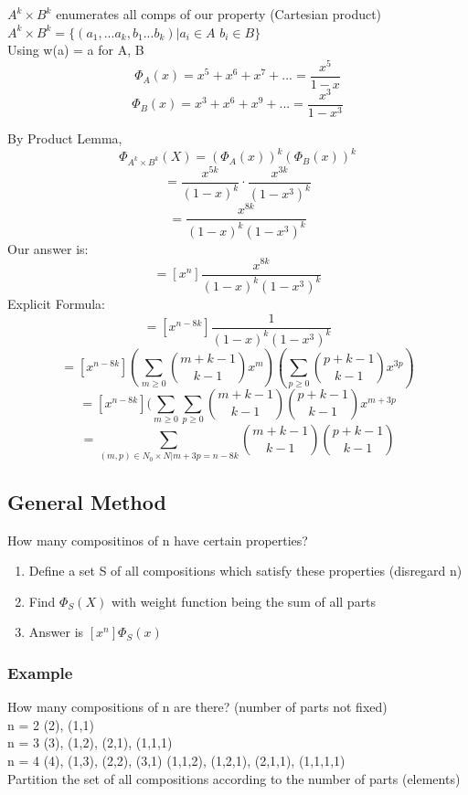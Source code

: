 \documentclass[12pt]{article}
\begin{document}
	$A^k \times B^k$ enumerates all comps of our property (Cartesian product)\\
	$A^k \times B^k = \{(a_1, ...a_k,b_1...b_k) | a_i \in A$ $b_i \in B\}$\\
	
	Using w(a) = a for A, B\\
	$$\Phi_A(x) = x^5 + x^6 + x^7 + ... = \frac{x^5}{1-x}$$
	$$\Phi_B(x) = x^3 + x^6 + x^9 + ... = \frac{x^3}{1-x^3}$$
	
	By Product Lemma, 
	$$\Phi_{A^k \times B^k}(X) = (\Phi_A(x))^k(\Phi_B(x))^k$$
	$$= \frac{x^{5k}}{(1-x)^k} \cdot \frac{x^{3k}}{(1-x^3)^k}$$
	$$= \frac{x^{8k}}{(1-x)^k(1-x^3)^k}$$
	Our answer is:
	$$= [x^n]\frac{x^{8k}}{(1-x)^k(1-x^3)^k}$$
	Explicit Formula:
	$$= [x^{n-8k}]\frac{1}{(1-x)^k(1-x^3)^k}$$
	$$= [x^{n-8k}](\sum_{m \geq 0}{m+k-1 \choose k-1}x^m)(\sum_{p \geq 0}{p+k-1 \choose k-1}x^{3p})$$
	$$= [x^{n-8k}](\sum_{m \geq 0}\sum_{p \geq 0}{m+k-1 \choose k-1}{p+k-1 \choose k-1}x^{m+3p}$$
	$$= \sum_{(m,p) \in N_0 \times N | m + 3p = n - 8k}{m+k-1 \choose k-1}{p+k-1 \choose k-1}$$
	
	\subsection*{General Method}
	How many compositinos of n have certain properties?\\
	\begin{enumerate}
		\item Define a set S of all compositions which satisfy these properties (disregard n)
		\item Find $\Phi_S(X)$ with weight function being the sum of all parts
		\item Answer is $[x^n]\Phi_S(x)$
	\end{enumerate}
	
	\subsubsection*{Example}
	How many compositions of n are there?
	(number of parts not fixed)\\
	n = 2 (2), (1,1)\\
	n = 3 (3), (1,2), (2,1), (1,1,1)\\
	n = 4 (4), (1,3), (2,2), (3,1) (1,1,2), (1,2,1), (2,1,1), (1,1,1,1)\\
	
	Partition the set of all compositions according to the number of parts (elements)\\
	
\end{document}
